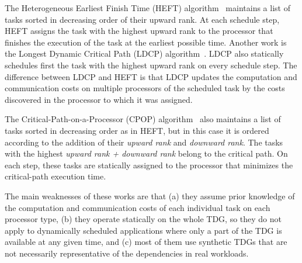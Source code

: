 The Heterogeneous Earliest Finish Time (HEFT) algorithm~\cite{HEFT} maintains a list of tasks sorted in decreasing order of their upward rank. At each schedule step, HEFT assigns the task with the highest upward rank to the processor that finishes the execution of the task at the earliest possible time. Another work is the Longest Dynamic Critical Path (LDCP) algorithm~\cite{LDCP}. LDCP also statically schedules first the task with the highest upward rank on every schedule step. The difference between LDCP and HEFT is that LDCP updates the computation and communication costs on multiple processors of the scheduled task by the costs discovered in the processor to which it was assigned.

The Critical-Path-on-a-Processor (CPOP) algorithm~\cite{HEFT} also maintains a list of tasks sorted in decreasing order as in HEFT, but in this case it is ordered according to the addition of their \textit{upward rank} and \textit{downward rank}. The tasks with the highest \textit{upward rank + downward rank} belong to the critical path. On each step, these tasks are statically assigned to the processor that minimizes the critical-path execution time.


The main weaknesses of these works are that (a) they assume prior knowledge of the computation and communication costs of each individual task on each processor type, (b) they operate statically on the whole TDG, so they do not apply to dynamically scheduled applications where only a part of the TDG is available at any given time, and (c) most of them use synthetic TDGs that are not necessarily representative of the dependencies in real workloads.






